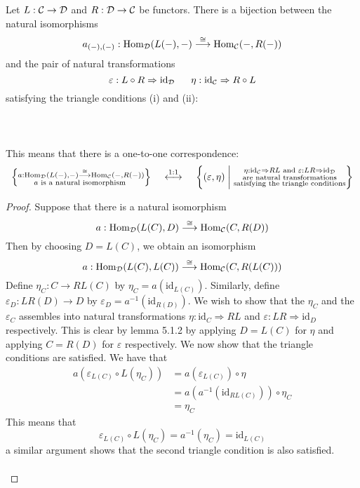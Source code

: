 \documentclass[a4paper]{article}
\begin{document}
\begin{thm}{}{} Let $L:\mathcal{C}\to\mathcal{D}$ and $R:\mathcal{D}\to\mathcal{C}$ be functors. There is a bijection between the natural isomorphisms $$a_{(-),(-)}:\operatorname{Hom}_{\mathcal{D}}(L(-),-)\overset{\cong}{\longrightarrow}\operatorname{Hom}_{\mathcal{C}}(-,R(-))$$ and the pair of natural transformations $$\varepsilon:L\circ R\Rightarrow\text{id}_{\mathcal{D}}\;\;\;\;\;\;\eta:\text{id}_{\mathcal{C}}\Rightarrow R\circ L$$ satisfying the triangle conditions (i) and (ii): \\~\\
 \\~\\
This means that there is a one-to-one correspondence: $$\left\{\substack{a:\operatorname{Hom}_{\mathcal{D}}(L(-),-)\overset{\cong}{\longrightarrow}\operatorname{Hom}_{\mathcal{C}}(-,R(-))\\a\text{ is a natural isomorphism }}\right\}\;\;\;\;\overset{1:1}{\longleftrightarrow}\;\;\;\;\left\{(\varepsilon,\eta)\;\bigg{|}\;\substack{\eta:\text{id}_{\mathcal{C}}\Rightarrow RL\text{ and }\varepsilon:LR\Rightarrow\text{id}_{\mathcal{D}}\\\text{ are natural transformations }\\\text{satisfying the triangle conditions}}\right\}$$ \tcbline
\begin{proof}
Suppose that there is a natural isomorphism $$a:\operatorname{Hom}_{\mathcal{D}}(L(C),D)\overset{\cong}{\longrightarrow}\operatorname{Hom}_{\mathcal{C}}(C,R(D))$$ Then by choosing $D=L(C)$, we obtain an isomorphism $$a:\operatorname{Hom}_{\mathcal{D}}(L(C),L(C))\overset{\cong}{\longrightarrow}\operatorname{Hom}_{\mathcal{C}}(C,R(L(C)))$$ Define $\eta_C:C\to RL(C)$ by $\eta_C=a(\text{id}_{L(C)})$. Similarly, define $\varepsilon_D:LR(D)\to D$ by $\varepsilon_D=a^{-1}(\text{id}_{R(D)})$. We wish to show that the $\eta_C$ and the $\varepsilon_C$ assembles into natural transformations $\eta:\text{id}_C\Rightarrow RL$ and $\varepsilon:LR\Rightarrow\text{id}_D$ respectively. This is clear by lemma 5.1.2 by applying $D=L(C)$ for $\eta$ and applying $C=R(D)$ for $\varepsilon$ respectively. We now show that the triangle conditions are satisfied. We have that 
\begin{align*}
a(\varepsilon_{L(C)}\circ L(\eta_C))&=a(\varepsilon_{L(C)})\circ\eta\tag{Naturality of $a$}\\
&=a(a^{-1}(\text{id}_{RL(C)}))\circ\eta_C\\
&=\eta_C
\end{align*}
This means that $$\varepsilon_{L(C)}\circ L(\eta_C)=a^{-1}(\eta_C)=\text{id}_{L(C)}$$ a similar argument shows that the second triangle condition is also satisfied. \\~\\


\end{proof}
\end{thm}
\end{document}
